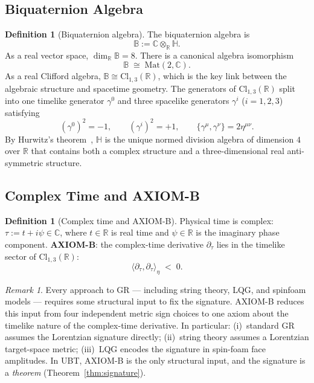 \documentclass[12pt,a4paper]{article}
\theoremstyle{definition}
\newtheorem{definition}[theorem]{Definition}
\theoremstyle{remark}
\newtheorem{remark}[theorem]{Remark}
\newcommand{\BB}{\mathbb{B}}
\newcommand{\CC}{\mathbb{C}}
\newcommand{\RR}{\mathbb{R}}
\newcommand{\HH}{\mathbb{H}}
\begin{document}
\subsection{Biquaternion Algebra}

\begin{definition}[Biquaternion algebra]
\label{def:biquaternion}
The biquaternion algebra is
\[
  \BB := \CC\otimes_\RR\HH.
\]
As a real vector space, $\dim_\RR\BB = 8$.
There is a canonical algebra isomorphism
\[
  \BB \;\cong\; \mathrm{Mat}(2,\CC).
\]
As a real Clifford algebra,
$\BB \cong \mathrm{Cl}_{1,3}(\RR)$,
which is the key link between the algebraic structure and spacetime geometry.
The generators of $\mathrm{Cl}_{1,3}(\RR)$ split into one timelike generator
$\gamma^0$ and three spacelike generators $\gamma^i$ ($i = 1,2,3$) satisfying
\[
  (\gamma^0)^2 = -1, \qquad
  (\gamma^i)^2 = +1, \qquad
  \{\gamma^\mu, \gamma^\nu\} = 2\eta^{\mu\nu}.
\]
By Hurwitz's theorem~\cite{hurwitz1923}, $\HH$ is the unique normed division
algebra of dimension $4$ over $\RR$ that contains both a complex structure
and a three-dimensional real anti-symmetric structure.
\end{definition}

\subsection{Complex Time and AXIOM-B}

\begin{definition}[Complex time and AXIOM-B]
\label{def:axiomb}
Physical time is complex: $\tau := t + i\psi \in \CC$,
where $t \in \RR$ is real time and $\psi \in \RR$ is the imaginary phase component.
\textbf{AXIOM-B}: the complex-time derivative $\partial_\tau$ lies in the
timelike sector of $\mathrm{Cl}_{1,3}(\RR)$:
\[
  \langle\partial_\tau,\partial_\tau\rangle_\eta \;<\; 0.
\]
\end{definition}

\begin{remark}
Every approach to GR — including string theory, LQG, and spinfoam models —
requires some structural input to fix the signature.
AXIOM-B reduces this input from four independent metric sign choices to one
axiom about the timelike nature of the complex-time derivative.
In particular:
(i)~standard GR assumes the Lorentzian signature directly;
(ii)~string theory assumes a Lorentzian target-space metric;
(iii)~LQG encodes the signature in spin-foam face amplitudes.
In UBT, AXIOM-B is the only structural input, and the signature is a
\emph{theorem} (Theorem~\ref{thm:signature}).
\end{remark}
\end{document}
